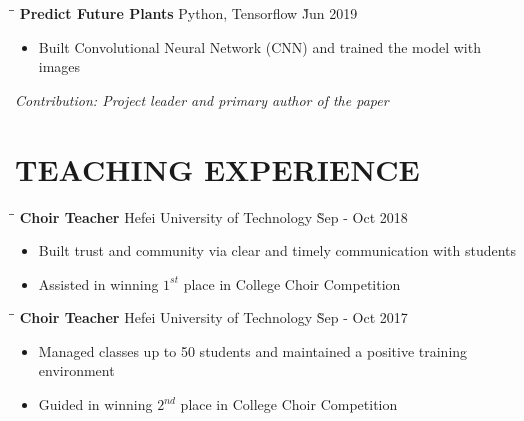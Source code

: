 \documentclass{res}
\begin{document}
\begin{resume}
    \vspace{-0.2in}	
    \begin{tabbing}
    \hspace{3in}\= \hspace{2in}\= \kill %
    {\bf Predict Future Plants} \> Python, Tensorflow \` Jun 2019 \\
    \end{tabbing}\vspace{-20pt}      %
    \begin{itemize} \itemsep -2pt %
    \item Built Convolutional Neural Network (CNN) and trained the model with images 
    \end{itemize}
    \vspace{-0.17in}
    {\sl Contribution: Project leader and primary author of the paper}

\vspace{-0.12in}
\section{TEACHING EXPERIENCE}
    \vspace{-0.1in}	
    \begin{tabbing}
    \hspace{2.3in}\= \hspace{2.6in}\= \kill %
    {\bf Choir Teacher} \> Hefei University of Technology     \` Sep - Oct 2018\\
    \end{tabbing}\vspace{-20pt}      %
    \begin{itemize} \itemsep -2pt %
    \item Built trust and community via clear and timely communication with students  
    \item Assisted in winning $1^{st}$ place in College Choir Competition
    \end{itemize}
    \vspace{-0.25in}	
    \begin{tabbing}
    \hspace{2.3in}\= \hspace{2.6in}\= \kill %
    {\bf Choir Teacher} \> Hefei University of Technology     \` Sep - Oct 2017\\
    \end{tabbing}\vspace{-20pt}      %
    \begin{itemize} \itemsep -2pt %
    \item Managed classes up to 50 students and maintained a positive training environment  
    \item Guided in winning $2^{nd}$ place in College Choir Competition
    \end{itemize}


\end{resume}
\end{document}
